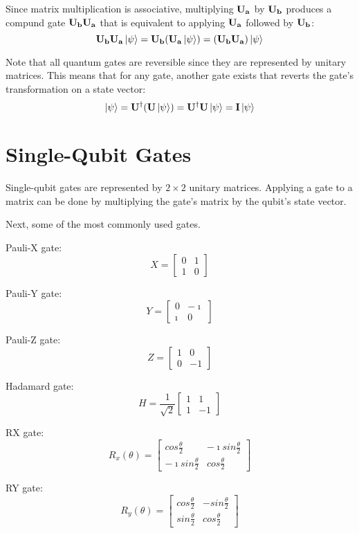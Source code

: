 Since matrix multiplication is associative, multiplying $\bf{U_a}$ by $\bf{U_b}$ produces a compund gate $\bf{U_{b}U_{a}}$ that is equivalent to applying $\bf{U_a}$ followed by $\bf{U_b}$:
$$\bf{U_b}\bf{U_a}\left|{\psi}\right\rangle=\bf{U_b}(\bf{U_a}\left|{\psi}\right\rangle)=(\bf{U_b}\bf{U_a})\left|{\psi}\right\rangle$$

Note that all quantum gates are reversible since they are represented by unitary matrices. This means that for any gate, another gate exists that reverts the gate's transformation on a state vector:
$$\left|{\psi}\right\rangle=\bf{U^{\dagger}}(\bf{U}\left|{\psi}\right\rangle)=\bf{U^{\dagger}}\bf{U}\left|{\psi}\right\rangle=\bf{I}\left|{\psi}\right\rangle$$

\section{Single-Qubit Gates}

Single-qubit gates are represented by $2 \times 2$ unitary matrices. Applying a gate to a matrix can be done by multiplying the gate's matrix by the qubit's state vector.

Next, some of the most commonly used gates.

Pauli-X gate:
$$X=\left[\begin{array}{cc}0 & 1 \\ 1 & 0\end{array}\right]$$

Pauli-Y gate:
$$Y=\left[\begin{array}{cc}0 & -\imath \\ \imath & 0\end{array}\right]$$

Pauli-Z gate:
$$Z=\left[\begin{array}{cc}1 & 0 \\ 0 & -1\end{array}\right]$$

Hadamard gate:
$$H=\frac{1}{\sqrt{2}}\left[\begin{array}{cc}1 & 1 \\ 1 & -1\end{array}\right]$$

RX gate:
$$R_x(\theta)=\left[\begin{array}{cc}cos{\frac{\theta}{2}} & -\imath sin{\frac{\theta}{2}} \\ -\imath sin{\frac{\theta}{2}} & cos{\frac{\theta}{2}}\end{array}\right]$$

RY gate:
$$R_y(\theta)=\left[\begin{array}{cc}cos{\frac{\theta}{2}} & -sin{\frac{\theta}{2}} \\ sin{\frac{\theta}{2}} & cos{\frac{\theta}{2}}\end{array}\right]$$


